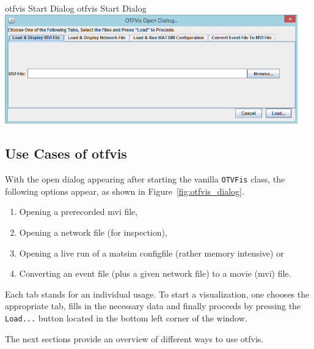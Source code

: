 \createfigure%
{\gls{otfvis} Start Dialog}%
{\gls{otfvis} Start Dialog}%
{\label{fig:otfvis_dialog}}%
{\includegraphics[width=0.95\textwidth, angle=0]{extending/figures/otfvis/image03.png}}%
{}

\subsection{Use Cases of \gls{otfvis}}
With the open dialog appearing after starting the vanilla \lstinline|OTVFis| class, the following options appear, as shown in Figure~\ref{fig:otfvis_dialog}.
%
\begin{enumerate}\styleEnumerate
	\item Opening a prerecorded \gls{mvi} file,
	\item Opening a network file (for inspection),
	\item Opening a live run of a \gls{matsim} \gls{configfile} (rather memory intensive) or
	\item Converting an event file (plus a given network file) to a movie (\gls{mvi}) file.
\end{enumerate}

Each tab stands for an individual usage. To start a visualization, one chooses the appropriate tab, fills in the necessary data and finally proceeds by pressing the \lstinline|Load...| button located in the bottom left corner of the window.

The next sections provide an overview of different ways to use \gls{otfvis}.

